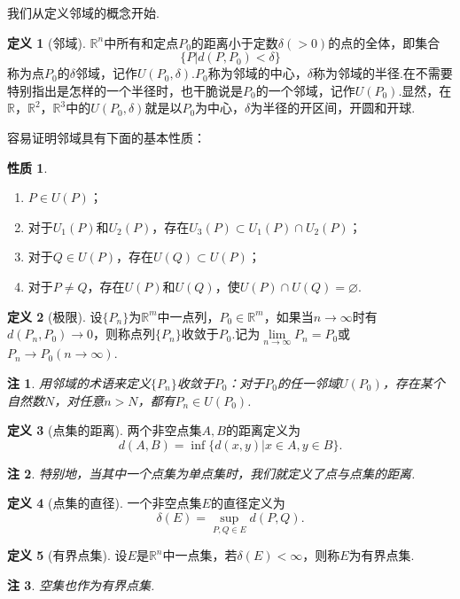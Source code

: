 \documentclass[lang=cn,12pt]{ctexart}
\theoremstyle{definition}
\newtheorem{definition}{定义}
\newtheorem{proposition}{性质}
\theoremstyle{plain}
\newtheorem*{remark}{注}
\begin{document}
我们从定义邻域的概念开始.
\begin{definition}[邻域]
	$\mathbb{R}^n$中所有和定点$P_0$的距离小于定数$\delta(>0)$的点的全体，即集合
	$$\{P|d(P,P_0)<\delta\}$$
	称为点$P_0$的$\delta${\heiti 邻域}，记作$U(P_0,\delta)$.$P_0$称为邻域的{\heiti 中心}，$\delta$称为邻域的{\heiti 半径}.在不需要特别指出是怎样的一个半径时，也干脆说是$P_0$的一个邻域，记作$U(P_0)$.显然，在$\mathbb{R}$，$\mathbb{R}^2$，$\mathbb{R}^3$中的$U(P_0,\delta)$就是以$P_0$为中心，$\delta$为半径的{\heiti 开区间}，{\heiti 开圆}和{\heiti 开球}.
\end{definition}
容易证明邻域具有下面的基本性质：
\begin{proposition}
	\begin{enumerate}
		\item $P\in U(P)$；
		\item 对于$U_1(P)$和$U_2(P)$，存在$U_3(P)\subset U_1(P)\cap U_2(P)$；
		\item 对于$Q\in U(P)$，存在$U(Q)\subset U(P)$；
		\item 对于$P\neq Q$，存在$U(P)$和$U(Q)$，使$U(P)\cap U(Q)=\varnothing$.
	\end{enumerate}
\end{proposition}
\begin{definition}[极限]
	设$\{P_n\}$为$\mathbb{R}^m$中一点列，$P_0\in\mathbb{R}^m$，如果当$n\to\infty$时有$d(P_n,P_0)\to 0$，则称点列$\{P_n\}${\heiti 收敛于}$P_0$.记为$\lim\limits_{n\to\infty}P_n=P_0$或$P_n\to P_0(n\to\infty)$.
\end{definition}
\begin{remark}
	用邻域的术语来定义$\{P_n\}$收敛于$P_0$：对于$P_0$的任一邻域$U(P_0)$，存在某个自然数$N$，对任意$n>N$，都有$P_n\in U(P_0)$.
\end{remark}
\begin{definition}[点集的距离]
	两个非空点集$A,B$的距离定义为
	$$d(A,B)=\inf\{d(x,y)|x\in A,y\in B\}.$$
\end{definition}
\begin{remark}
	特别地，当其中一个点集为单点集时，我们就定义了点与点集的距离.
\end{remark}
\begin{definition}[点集的直径]
	一个非空点集$E$的{\heiti 直径}定义为
	$$\delta(E)=\sup\limits_{P,Q\in E}d(P,Q).$$
\end{definition}
\begin{definition}[有界点集]
	设$E$是$\mathbb{R}^n$中一点集，若$\delta(E)<\infty$，则称$E$为{\heiti 有界点集}.
\end{definition}
\begin{remark}
	空集也作为有界点集.
\end{remark}
\end{document}
